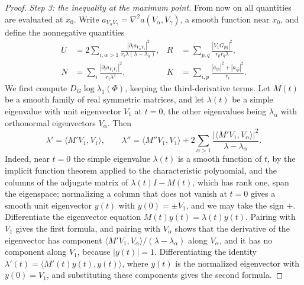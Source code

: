 \begin{proof}
\emph{Step 3: the inequality at the maximum point.} From now on all quantities are evaluated at $x_0$. Write $a_{V_\alpha V_\gamma}=\nabla^2a(V_\alpha,V_\gamma)$, a smooth function near $x_0$, and define the nonnegative quantities
\begin{align*}
 U&=2\sum_{i,\alpha>1}
       \frac{|\partial_i a_{V_\alpha V_1}|^2}
                      {r_i\lambda(\lambda-\lambda_\alpha)},&
 R&=\sum_{p,q}\frac{|V_1G_{p\bar q}|^2}{r_pr_q\lambda},\\
 N&=\sum_i\frac{|\partial_i a_{V_1V_1}|^2}{r_i\lambda^2},&
 K&=\sum_{i,p}\frac{|a_{ip}|^2+|a_{i\bar p}|^2}{r_i}.
\end{align*}
We first compute $D_G\log\lambda_1(\Phi)$, keeping the third-derivative terms. Let $M(t)$ be a smooth family of real symmetric matrices, and let $\lambda(t)$ be a simple eigenvalue with unit eigenvector $V_1$ at $t=0$, the other eigenvalues being $\lambda_\alpha$ with orthonormal eigenvectors $V_\alpha$. Then
\[
 \lambda'=\langle M'V_1,V_1\rangle,\qquad
 \lambda''=\langle M''V_1,V_1\rangle
       +2\sum_{\alpha>1}
        \frac{|\langle M'V_1,V_\alpha\rangle|^2}
                             {\lambda-\lambda_\alpha}.
\]
Indeed, near $t=0$ the simple eigenvalue $\lambda(t)$ is a smooth function of $t$, by the implicit function theorem applied to the characteristic polynomial, and the columns of the adjugate matrix of $\lambda(t)I-M(t)$, which has rank one, span the eigenspace; normalizing a column that does not vanish at $t=0$ gives a smooth unit eigenvector $y(t)$ with $y(0)=\pm V_1$, and we may take the sign $+$. Differentiate the eigenvector equation $M(t)y(t)=\lambda(t)y(t)$. Pairing with $V_1$ gives the first formula, and pairing with $V_\alpha$ shows that the derivative of the eigenvector has component $\langle M'V_1,V_\alpha\rangle/(\lambda-\lambda_\alpha)$ along $V_\alpha$, and it has no component along $V_1$, because $|y(t)|=1$. Differentiating the identity $\lambda'(t)=\langle M'(t)y(t),y(t)\rangle$, where $y(t)$ is the normalized eigenvector with $y(0)=V_1$, and substituting these components gives the second formula.


\end{proof}
